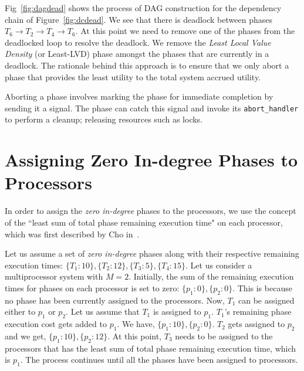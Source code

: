 \documentclass[12pt,dvips]{report}
\begin{document}
Fig~\ref{fig:dagdead} shows the process of DAG construction for the dependency chain of Figure~\ref{fig:dcdead}. We see that there is deadlock between phases $T_6 \rightarrow T_2 \rightarrow T_4 \rightarrow T_6$. At this point we need to remove one of the phases from the deadlocked loop to resolve the deadlock. We remove the \textit{Least Local Value Density} (or Least-LVD) phase amongst the phases that are currently in a deadlock. The rationale behind this approach is to ensure that we only abort a phase that provides the least utility to the total system accrued utility.

Aborting a phase involves marking the phase for immediate completion by sending it a signal. The phase can catch this signal and invoke its \texttt{abort\_handler} to perform a cleanup; releasing resources such as locks. 

\section{Assigning Zero In-degree Phases to Processors}\label{findproc}

In order to assign the \textit{zero in-degree} phases to the processors, we use the concept of the ``least sum of total phase remaining execution time" on each processor, which was first described by Cho in~\cite{cho-thesis06}.

Let us assume a set of \textit{zero in-degree} phases along with their respective remaining execution times: $\{T_1:10\}, \{T_2:12\}, \{T_3:5\}, \{T_4:15\}$. Let us consider a multiprocessor system with $M=2$. Initially, the sum of the remaining execution times for phases on each processor is set to zero: $\{p_1:0\}, \{p_2:0\}$. This is because no phase has been currently assigned to the processors. Now, $T_1$ can be assigned either to $p_1$ or $p_2$. Let us assume that $T_1$ is assigned to $p_1$. $T_1$'s remaining phase execution cost gets added to $p_1$. We have, $\{p_1:10\}, \{p_2:0\}$. $T_2$ gets assigned to $p_2$ and we get, $\{p_1:10\}, \{p_2:12\}$. At this point, $T_3$ needs to be assigned to the processors that has the least sum of total phase remaining execution time, which is $p_1$. The process continues until all the phases have been assigned to processors.
\end{document}

